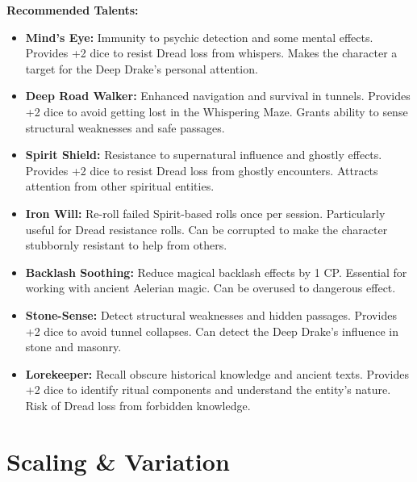 \documentclass[11pt]{article}
\begin{document}
\textbf{Recommended Talents:}
\begin{itemize}
\item \textbf{Mind's Eye:} Immunity to psychic detection and some mental effects. Provides +2 dice to resist Dread loss from whispers. Makes the character a target for the Deep Drake's personal attention.
\item \textbf{Deep Road Walker:} Enhanced navigation and survival in tunnels. Provides +2 dice to avoid getting lost in the Whispering Maze. Grants ability to sense structural weaknesses and safe passages.
\item \textbf{Spirit Shield:} Resistance to supernatural influence and ghostly effects. Provides +2 dice to resist Dread loss from ghostly encounters. Attracts attention from other spiritual entities.
\item \textbf{Iron Will:} Re-roll failed Spirit-based rolls once per session. Particularly useful for Dread resistance rolls. Can be corrupted to make the character stubbornly resistant to help from others.
\item \textbf{Backlash Soothing:} Reduce magical backlash effects by 1 CP. Essential for working with ancient Aelerian magic. Can be overused to dangerous effect.
\item \textbf{Stone-Sense:} Detect structural weaknesses and hidden passages. Provides +2 dice to avoid tunnel collapses. Can detect the Deep Drake's influence in stone and masonry.
\item \textbf{Lorekeeper:} Recall obscure historical knowledge and ancient texts. Provides +2 dice to identify ritual components and understand the entity's nature. Risk of Dread loss from forbidden knowledge.
\end{itemize}

\section{Scaling \& Variation}
\end{document}
